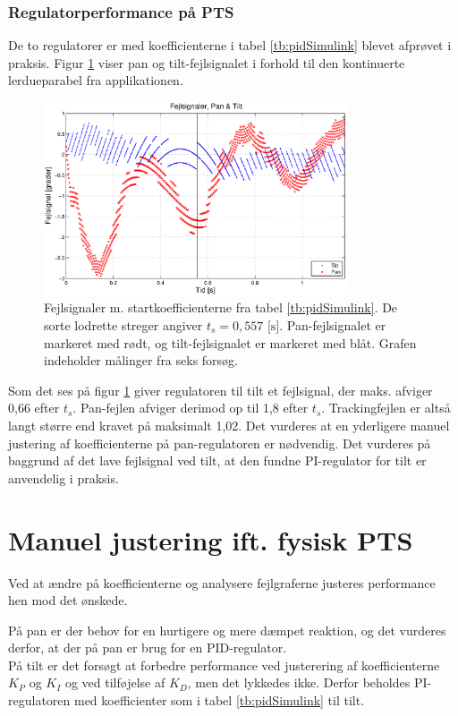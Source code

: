 \subsubsection{Regulatorperformance på PTS}
De to regulatorer er med koefficienterne i tabel \ref{tb:pidSimulink} blevet afprøvet i praksis.
Figur \ref{fig:pidPhys1} viser pan og tilt-fejlsignalet i forhold til den kontinuerte lerdueparabel fra applikationen.

\begin{figure}[h!]
\centering
\includegraphics[width=0.8\textwidth]{./graphics/pidPhys1.eps}
\captionsetup{width=0.8\textwidth}
\caption[Fejlsignaler m. startkoefficienter]{Fejlsignaler m. startkoefficienterne fra tabel \ref{tb:pidSimulink}.
	De sorte lodrette streger angiver \(t_s=0,557 \text{ [s]}\).
	Pan-fejlsignalet er markeret med rødt, og tilt-fejlsignalet er markeret med blåt.
	Grafen indeholder målinger fra seks forsøg.} 
\label{fig:pidPhys1}
\end{figure}

Som det ses på figur \ref{fig:pidPhys1} giver regulatoren til tilt et fejlsignal,
der maks. afviger 0,66\degree{} efter \(t_s\).
Pan-fejlen afviger derimod op til 1,8\degree{} efter \(t_s\).
Trackingfejlen er altså langt større end kravet på maksimalt 1,02\degree.
Det vurderes at en yderligere manuel justering af koefficienterne på pan-regulatoren er nødvendig.
Det vurderes på baggrund af det lave fejlsignal ved tilt, at den fundne
PI-regulator for tilt er anvendelig i praksis.


\section{Manuel justering ift. fysisk PTS}
Ved at ændre på koefficienterne og analysere fejlgraferne justeres performance 
hen mod det ønskede.

På pan er der behov for en hurtigere og mere dæmpet reaktion,
og det vurderes derfor, at der på pan er brug for en PID-regulator.
\\
På tilt er det forsøgt at forbedre performance ved justerering af koefficienterne \(K_P\) og \(K_I\)
og ved tilføjelse af \(K_D\), men det lykkedes ikke. Derfor beholdes 
PI-regulatoren med koefficienter som i tabel \ref{tb:pidSimulink} til tilt.

